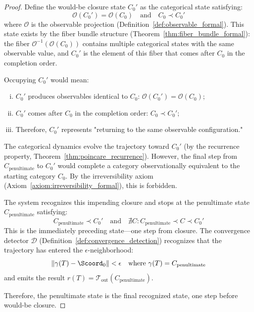 \begin{proof}
Define the would-be closure state $C_0'$ as the categorical state satisfying:
\begin{equation}
\mathcal{O}(C_0') = \mathcal{O}(C_0) \quad \text{and} \quad C_0 \prec C_0'
\end{equation}
where $\mathcal{O}$ is the observable projection (Definition~\ref{def:observable_formal}). This state exists by the fiber bundle structure (Theorem~\ref{thm:fiber_bundle_formal}): the fiber $\mathcal{O}^{-1}(\mathcal{O}(C_0))$ contains multiple categorical states with the same observable value, and $C_0'$ is the element of this fiber that comes after $C_0$ in the completion order.

Occupying $C_0'$ would mean:
\begin{enumerate}[(i)]
    \item $C_0'$ produces observables identical to $C_0$: $\mathcal{O}(C_0') = \mathcal{O}(C_0)$;
    \item $C_0'$ comes after $C_0$ in the completion order: $C_0 \prec C_0'$;
    \item Therefore, $C_0'$ represents "returning to the same observable configuration."
\end{enumerate}

The categorical dynamics evolve the trajectory toward $C_0'$ (by the recurrence property, Theorem~\ref{thm:poincare_recurrence}). However, the final step from $C_{\text{penultimate}}$ to $C_0'$ would complete a category observationally equivalent to the starting category $C_0$. By the irreversibility axiom (Axiom~\ref{axiom:irreversibility_formal}), this is forbidden.

The system recognizes this impending closure and stops at the penultimate state $C_{\text{penultimate}}$ satisfying:
\begin{equation}
C_{\text{penultimate}} \prec C_0' \quad \text{and} \quad \nexists C: C_{\text{penultimate}} \prec C \prec C_0'
\end{equation}
This is the immediately preceding state---one step from closure. The convergence detector $\mathcal{D}$ (Definition~\ref{def:convergence_detection}) recognizes that the trajectory has entered the $\epsilon$-neighborhood:
\begin{equation}
\|\gamma(T) - \Scoord_0\| < \epsilon \quad \text{where } \gamma(T) = C_{\text{penultimate}}
\end{equation}
and emits the result $r(T) = \mathcal{T}_{\text{out}}(C_{\text{penultimate}})$.

Therefore, the penultimate state is the final recognized state, one step before would-be closure.
\end{proof}


